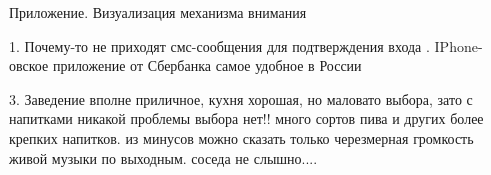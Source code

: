 \documentclass{beamer}
\begin{document}
\begin{frame}{Приложение. Визуализация механизма внимания}

1.
\colorbox{yellow!70}{Почему-то}
\colorbox{yellow!100}{не}
\colorbox{yellow!57}{приходят}
\colorbox{yellow!17}{смс-сообщения}
\colorbox{yellow!5}{для}
\colorbox{yellow!7}{подтверждения}
\colorbox{yellow!0}{входа}
.
\colorbox{yellow!3}{IPhone-овское}
\colorbox{yellow!2}{приложение}
\colorbox{yellow!2}{от}
\colorbox{yellow!30}{Сбербанка}
\colorbox{yellow!89}{самое}
\colorbox{yellow!100}{удобное}
\colorbox{yellow!84}{в}
\colorbox{yellow!82}{России}
\linebreak

3.
\colorbox{yellow!14}{Заведение}
\colorbox{yellow!41}{вполне}
\colorbox{yellow!62}{приличное,}
\colorbox{yellow!78}{кухня}
\colorbox{yellow!99}{хорошая,}
\colorbox{yellow!27}{но}
\colorbox{yellow!25}{маловато}
\colorbox{yellow!11}{выбора,}
\colorbox{yellow!8}{зато}
\colorbox{yellow!2}{с}
\colorbox{yellow!2}{напитками}
\colorbox{yellow!2}{никакой}
\colorbox{yellow!2}{проблемы}
\colorbox{yellow!3}{выбора}
\colorbox{yellow!2}{нет!!}
\colorbox{yellow!2}{много}
\colorbox{yellow!2}{сортов}
\colorbox{yellow!2}{пива}
\colorbox{yellow!3}{и}
\colorbox{yellow!2}{других}
\colorbox{yellow!1}{более}
\colorbox{yellow!2}{крепких}
\colorbox{yellow!1}{напитков.}
\colorbox{yellow!1}{из}
\colorbox{yellow!3}{минусов}
\colorbox{yellow!3}{можно}
\colorbox{yellow!4}{сказать}
\colorbox{yellow!4}{только}
\colorbox{yellow!10}{черезмерная}
\colorbox{yellow!8}{громкость}
\colorbox{yellow!12}{живой}
\colorbox{yellow!8}{музыки}
\colorbox{yellow!4}{по}
\colorbox{yellow!5}{выходным.}
\colorbox{yellow!6}{соседа}
\colorbox{yellow!11}{не}
\colorbox{yellow!11}{слышно....}

\end{frame}
\end{document}
